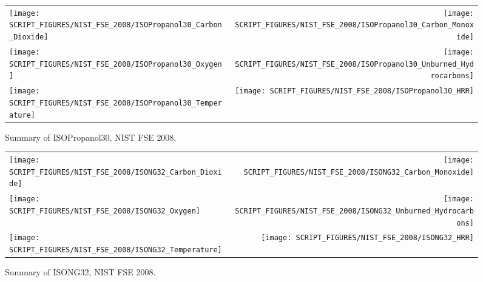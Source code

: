 \begin{figure}[p]
\begin{tabular*}{\textwidth}{l@{\extracolsep{\fill}}r}
\texttt{[image: SCRIPT\_FIGURES/NIST\_FSE\_2008/ISOPropanol30\_Carbon\_Dioxide]} &
\texttt{[image: SCRIPT\_FIGURES/NIST\_FSE\_2008/ISOPropanol30\_Carbon\_Monoxide]} \\
\texttt{[image: SCRIPT\_FIGURES/NIST\_FSE\_2008/ISOPropanol30\_Oxygen]} &
\texttt{[image: SCRIPT\_FIGURES/NIST\_FSE\_2008/ISOPropanol30\_Unburned\_Hydrocarbons]} \\
\texttt{[image: SCRIPT\_FIGURES/NIST\_FSE\_2008/ISOPropanol30\_Temperature]} &
\texttt{[image: SCRIPT\_FIGURES/NIST\_FSE\_2008/ISOPropanol30\_HRR]}
\end{tabular*}
\caption[Summary of ISOPropanol30, NIST FSE 2008]{Summary of ISOPropanol30, NIST FSE 2008.}
\label{NIST_FSE_1994_ISOPropanol30}
\end{figure}

\begin{figure}[p]
\begin{tabular*}{\textwidth}{l@{\extracolsep{\fill}}r}
\texttt{[image: SCRIPT\_FIGURES/NIST\_FSE\_2008/ISONG32\_Carbon\_Dioxide]} &
\texttt{[image: SCRIPT\_FIGURES/NIST\_FSE\_2008/ISONG32\_Carbon\_Monoxide]} \\
\texttt{[image: SCRIPT\_FIGURES/NIST\_FSE\_2008/ISONG32\_Oxygen]} &
\texttt{[image: SCRIPT\_FIGURES/NIST\_FSE\_2008/ISONG32\_Unburned\_Hydrocarbons]} \\
\texttt{[image: SCRIPT\_FIGURES/NIST\_FSE\_2008/ISONG32\_Temperature]} &
\texttt{[image: SCRIPT\_FIGURES/NIST\_FSE\_2008/ISONG32\_HRR]}
\end{tabular*}
\caption[Summary of ISONG32, NIST FSE 2008]{Summary of ISONG32, NIST FSE 2008.}
\label{NIST_FSE_1994_ISONG32}
\end{figure}


\clearpage

